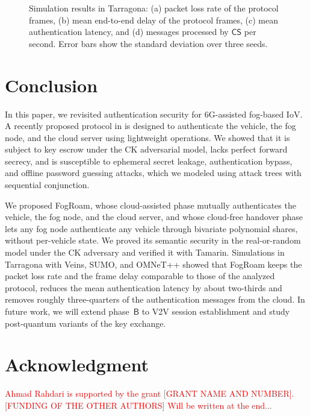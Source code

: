 \documentclass[journal]{IEEEtran}
\theoremstyle{plain}
\theoremstyle{definition}
\newcommand{\CS}{\mathsf{CS}}            %
\newcommand{\protocol}{\textsf{FogRoam}}   %
\begin{document}
\begin{figure}[!t]
\vspace{-10pt}
\caption{Simulation results in Tarragona: (a) packet loss rate of the protocol frames, (b) mean end-to-end delay of the protocol frames, (c) mean authentication latency, and (d) messages processed by $\CS$ per second. Error bars show the standard deviation over three seeds.}
\label{fig:sim}
\end{figure}




\section{Conclusion}\label{sec:concl}
In this paper, we revisited authentication security for 6G-assisted fog-based IoV. A recently proposed protocol in \cite{chen2024provably} is designed to authenticate the vehicle, the fog node, and the cloud server using lightweight operations. We showed that it is subject to key escrow under the CK adversarial model, lacks perfect forward secrecy, and is susceptible to ephemeral secret leakage, authentication bypass, and offline password guessing attacks, which we modeled using attack trees with sequential conjunction.

We proposed {\protocol}, whose cloud-assisted phase mutually authenticates the vehicle, the fog node, and the cloud server, and whose cloud-free handover phase lets any fog node authenticate any vehicle through bivariate polynomial shares, without per-vehicle state. We proved its semantic security in the real-or-random model under the CK adversary and verified it with Tamarin. Simulations in Tarragona with Veins, SUMO, and OMNeT++ showed that {\protocol} keeps the packet loss rate and the frame delay comparable to those of the analyzed protocol, reduces the mean authentication latency by about two-thirds and removes roughly three-quarters of the authentication messages from the cloud. In future work, we will extend phase~$\mathsf{B}$ to V2V session establishment and study post-quantum variants of the key exchange.

\section*{Acknowledgment}
\textcolor{red}{Ahmad Rahdari is supported by the grant [GRANT NAME AND NUMBER]. [FUNDING OF THE OTHER AUTHORS] Will be written at the end...}



\end{document}
